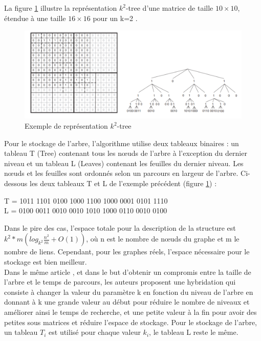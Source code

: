 La figure \ref{k2-trees-exemples} illustre la représentation $k^2$-tree d'une matrice de taille $10 \times 10$, étendue à une  taille $16 \times 16$ pour un k=2 \citep{brisaboa2015efficient}.

\begin{figure}[H]
\begin{center}
\includegraphics[height=200 pt, width=450 pt]{./ressources/image/k2-trees.png} 
\end{center}
\caption{Exemple de représentation $k^2$-tree}
\label{k2-trees-exemples}
\end{figure}


Pour le stockage de l'arbre, l'algorithme utilise deux tableaux binaires : un tableau T (Tree) contenant tous les nœuds de l'arbre à l'exception du dernier niveau et un tableau L (Leaves) contenant les feuilles du dernier niveau. Les nœuds et les feuilles sont ordonnés selon un parcours en largeur de l'arbre.   
Ci-dessous les deux tableaux T et L de l'exemple précédent (figure \ref{k2-trees-exemples}) : \\
\begin{center}
	T = 1011 1101 0100 1000 1100 1000 0001 0101 1110\\
	L = 0100 0011 0010 0010 1010 1000 0110 0010 0100\\	
\end{center}
Dans le pire des cas, l'espace totale pour la description de la structure est $k^2*m(log_{k^2}\frac{n^2}{m}+ \textit{O}(1))$, où n est le nombre de nœuds du graphe et m le nombre de liens. Cependant, pour les graphes réels, l'espace nécessaire pour le stockage est bien meilleur. \\

Dans le même article \citep{brisaboa2009k}, et dans le but d'obtenir un compromis entre la taille de l'arbre et le temps de parcours, les auteurs proposent une hybridation qui consiste à changer la valeur du paramètre k en fonction du niveau de l'arbre en donnant à k une grande valeur au début pour réduire le nombre de niveaux et améliorer ainsi le temps de recherche, et une petite valeur à la fin pour avoir des petites sous matrices et réduire l'espace de stockage.
Pour le stockage de l'arbre, un tableau $T_{i}$ est utilisé pour chaque valeur $k_{i}$, le tableau L reste le même.\\

